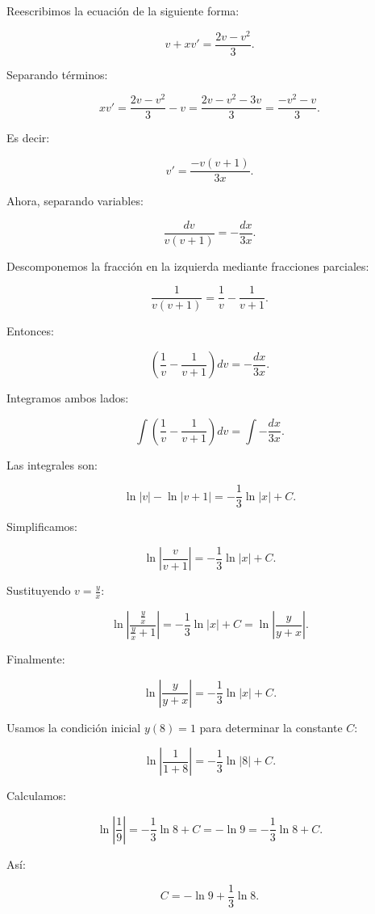 \documentclass[answers]{exam}
\begin{document}
\begin{questions}
\begin{parts}
		Reescribimos la ecuación de la siguiente forma:

		\[
			v + x v' = \frac{2v - v^2}{3}.
		\]

		Separando términos:

		\[
			x v' = \frac{2v - v^2}{3} - v
			= \frac{2v - v^2 - 3v}{3}
			= \frac{-v^2 - v}{3}.
		\]

		Es decir:

		\[
			v' = \frac{-v(v + 1)}{3x}.
		\]

		Ahora, separando variables:

		\[
			\frac{dv}{v(v + 1)} = -\frac{dx}{3x}.
		\]

		Descomponemos la fracción en la izquierda mediante fracciones parciales:

		\[
			\frac{1}{v(v + 1)} = \frac{1}{v} - \frac{1}{v + 1}.
		\]

		Entonces:

		\[
			\left( \frac{1}{v} - \frac{1}{v + 1} \right) dv = -\frac{dx}{3x}.
		\]

		Integramos ambos lados:

		\[
			\int \left( \frac{1}{v} - \frac{1}{v + 1} \right) dv = \int -\frac{dx}{3x}.
		\]

		Las integrales son:

		\[
			\ln |v| - \ln |v + 1| = -\frac{1}{3} \ln |x| + C.
		\]

		Simplificamos:

		\[
			\ln \left| \frac{v}{v + 1} \right| = -\frac{1}{3} \ln |x| + C.
		\]

		Sustituyendo \( v = \frac{y}{x} \):

		\[
			\ln \left| \frac{\frac{y}{x}}{\frac{y}{x} + 1} \right| = -\frac{1}{3} \ln |x| + C
			= \ln \left| \frac{y}{y + x} \right|.
		\]

		Finalmente:

		\[
			\ln \left| \frac{y}{y + x} \right| = -\frac{1}{3} \ln |x| + C.
		\]

		Usamos la condición inicial \( y(8) = 1 \) para determinar la constante \( C \):

		\[
			\ln \left| \frac{1}{1 + 8} \right| = -\frac{1}{3} \ln |8| + C.
		\]

		Calculamos:

		\[
			\ln \left| \frac{1}{9} \right| = -\frac{1}{3} \ln 8 + C
			= -\ln 9 = -\frac{1}{3} \ln 8 + C.
		\]

		Así:

		\[
			C = -\ln 9 + \frac{1}{3} \ln 8.
		\]


\end{parts}
\end{questions}
\end{document}
